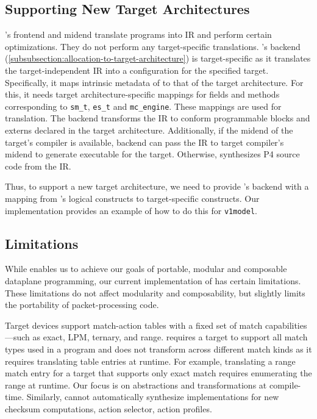 \documentclass[letterpaper,twocolumn,10pt]{article}
\begin{document}





\subsection{Supporting New Target Architectures}
\label{sec:new-target}
\ucomp's frontend and midend translate \ulang programs into \uarch IR
and perform certain optimizations. They do not perform any
target-specific translations. \ucomp's backend
(\cref{subsubsection:allocation-to-target-architecture}) is
target-specific as it translates the target-independent \uarch IR into
a configuration for the specified target. Specifically, it maps
intrinsic metadata of \uarch to that of the target architecture. For
this, it needs target architecture-specific mappings for fields and
methods corresponding to \texttt{sm\_t}, \texttt{es\_t} and
\texttt{mc\_engine}. These mappings are used for translation. The
backend transforms the IR to conform programmable blocks and externs
declared in the target architecture. Additionally, if the midend of
the target's compiler is available, \ucomp backend can pass the IR to
target compiler's midend to generate executable for the target.
Otherwise, \ucomp synthesizes P4 source code from the IR.

Thus, to support a new target architecture, we need to provide
\ucomp's backend with a mapping from \uarch's logical constructs to
target-specific constructs. Our implementation provides an example of
how to do this for \texttt{v1model}.





\subsection{Limitations}
\label{sec:limitations}
While \ulang enables us to achieve our goals of portable, modular and
composable dataplane programming, our current implementation of \ucomp
has certain limitations. These limitations do not affect modularity
and composability, but slightly limits the portability of
packet-processing code.

Target devices support match-action tables with a fixed set of match
capabilities---such as exact, LPM, ternary, and range. \ulang requires
a target to support all match types used in a program and \ucomp does
not transform across different match kinds as it requires translating
table entries at runtime. For example, translating a range match entry
for a target that supports only exact match requires enumerating the
range at runtime.  Our focus is on abstractions and transformations at
compile-time. Similarly, \ulang cannot automatically synthesize
implementations for new checksum computations, action selector, action
profiles.
\end{document}
